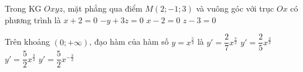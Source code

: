 \begin{ex}%
	Trong KG $Oxyz$, mặt phẳng qua điểm $M(2;-1;3)$ và vuông góc với trục $Ox$ có phương trình là
	\choice
	{$x+2=0$}
	{$-y+3z=0$}
	{\True $x-2=0$}
	{$z-3=0$}
\end{ex}
\begin{ex}%
	Trên khoảng $(0;+\infty)$, đạo hàm của hàm số $y=x^{\frac{5}{2}}$ là
	\choice
	{$y'=\dfrac{2}{7}x^{\frac{7}{2}}$}
	{$y'=\dfrac{2}{5}x^{\frac{3}{2}}$}
	{\True $y'=\dfrac{5}{2}x^{\frac{3}{2}}$}
	{$y'=\dfrac{5}{2}x^{-\frac{3}{2}}$}
\end{ex}



